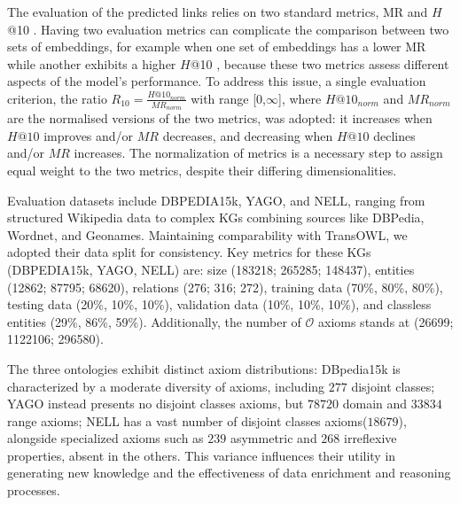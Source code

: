 \documentclass[sigconf]{acmart}
\newcommand{\TransHI}{TransHySeCo\xspace}
\begin{document}
The evaluation of the predicted links relies on two standard metrics, MR and $H$@10 \cite{MR_H@10}. Having two evaluation metrics can complicate the comparison between two sets of embeddings, for example when one set of embeddings has a lower MR while another exhibits a higher $H$@10 %
, because these two metrics assess different aspects of the model's performance.
To address this issue, a single evaluation criterion, the ratio \( R_{10}=\frac{H@10_{norm}}{MR_{norm}}\) with range [0,$\infty$], where $H@10_{norm}$ and $MR_{norm}$ are the normalised versions of the two metrics, was adopted: it increases when $H@10$ improves and/or $MR$ decreases, and decreasing when $H@10$ declines and/or $MR$ increases. The normalization of metrics is a necessary step to assign equal weight to the two metrics, despite their differing dimensionalities.

Evaluation datasets include DBPEDIA15k, YAGO, and NELL, ranging from structured Wikipedia data to complex KGs combining sources like DBPedia, Wordnet, and Geonames. Maintaining comparability with TransOWL, we adopted their data split for consistency.
Key metrics for these KGs (DBPEDIA15k, YAGO, NELL) are: size (183218; 265285; 148437), entities (12862; 87795; 68620), relations (276; 316; 272), training data (70\%, 80\%, 80\%), testing data (20\%, 10\%, 10\%), validation data (10\%, 10\%, 10\%), and classless entities (29\%, 86\%, 59\%). Additionally, the number of $\mathcal{O}$ axioms stands at (26699; 1122106; 296580).

The three ontologies exhibit distinct axiom distributions: DBpedia15k is characterized by a moderate diversity of axioms, including $277$ disjoint classes; YAGO instead presents no disjoint classes axioms, but $78720$ domain and $33834$ range axioms; NELL has a vast number of disjoint classes axioms($18679$), alongside specialized axioms such as $239$ asymmetric and $268$ irreflexive properties, absent in the others. This variance influences their utility in generating new knowledge and the effectiveness of data enrichment and reasoning processes.

\end{document}
